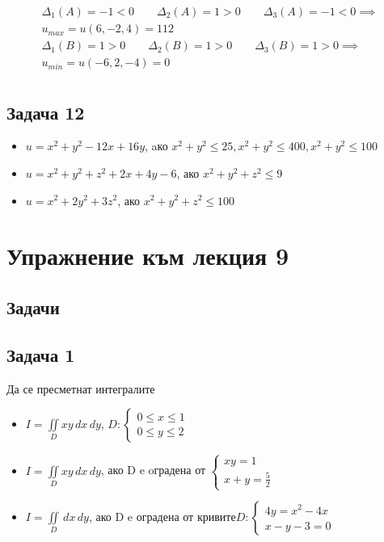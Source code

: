 \documentclass[a4paper,fleqn,12pt]{article}
\theoremstyle{definition}
\begin{document}
\begin{itemize}
\begin{gather*}
\Delta_1(A) = -1 < 0 \qquad \Delta_2(A) = 1>0 \qquad \Delta_3(A) = -1<0 \implies \\
u_{max} = u(6,-2,4) = 112\\
\Delta_1(B) = 1>0 \qquad \Delta_2(B) = 1>0 \qquad \Delta_3(B) = 1>0 \implies \\
u_{min} = u(-6,2,-4) = 0\\
\end{gather*}

\end{itemize}

\subsection*{Задача 12}

\begin{itemize}
\item $u = x^2 + y^2 - 12x + 16y$, aко $ x^2 + y^2 \leq 25, x^2 + y^2 \leq 400, x^2 + y^2 \leq 100$
\item $u = x^2 + y^2+ z^2 +2x + 4y -6 $, ако $x^2 + y^2 + z^2 \leq 9$
\item $u = x^2 + 2y^2+ 3z^2$, ако $x^2 + y^2+ z^2 \leq 100$ 
\end{itemize}


\newpage 
\section{Упражнение към лекция 9}

\subsection{Задачи}

\subsection*{Задача 1}
Да се пресметнат интегралите
\begin{itemize}
\item $I = \iint\limits_D xy \,dx \,dy$, $D: \begin{cases} 0 \leq x \leq 1 \\ 0 \leq y \leq 2 \end{cases}$
\item $I = \iint\limits _D xy \,dx \,dy$, ако D e oградена от $\begin{cases} xy = 1 \\ x+y = \frac{5}{2} \end{cases}$
\item $I = \iint\limits _D \,dx \,dy$, ако D e оградена от кривите$D: \begin{cases} 4y = x^2 - 4x \\ x - y - 3 = 0 \end{cases}$
\end{itemize}
\end{document}
